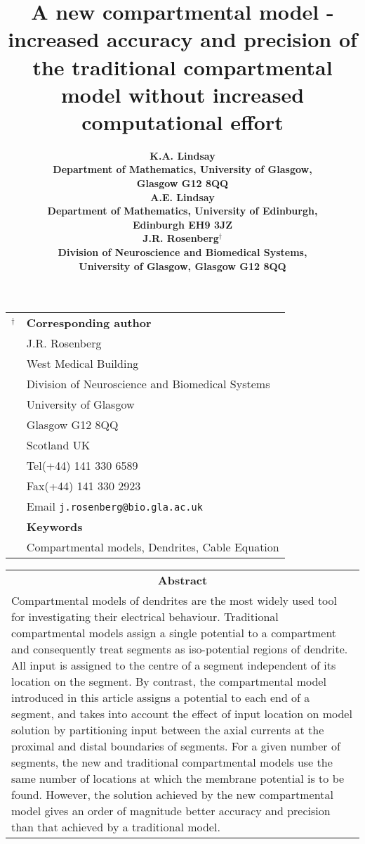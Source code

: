 \documentclass[11pt]{article}
\title{\LARGE\bf A new compartmental model - increased accuracy
and precision of the traditional compartmental model
without increased computational effort}
\author{\Large\bf K.A. Lindsay\\
Department of Mathematics, University of Glasgow,\\ Glasgow G12
8QQ \\[10pt]
\Large\bf A.E. Lindsay\\
Department of Mathematics, University of Edinburgh,\\ Edinburgh EH9
3JZ \\[10pt]
\Large\bf J.R. Rosenberg$^\dagger$\\
Division of Neuroscience and Biomedical Systems,\\
University of Glasgow, Glasgow G12 8QQ}
\begin{document}

\maketitle

\thispagestyle{empty}

\vfil

\begin{tabular}{ll}
$^\dagger$  & \textbf{Corresponding author} \\[5pt]
            & J.R. Rosenberg \\
            & West Medical Building \\
            & Division of Neuroscience and Biomedical Systems \\
            & University of Glasgow \\
            & Glasgow G12 8QQ \\
            & Scotland UK \\[5pt]
            & Tel\quad(+44) 141 330 6589 \\
            & Fax\quad(+44) 141 330 2923 \\
            & Email \verb$j.rosenberg@bio.gla.ac.uk$\\[10pt]
            & \textbf{Keywords} \\[5pt]
            & Compartmental models, Dendrites, Cable Equation
\end{tabular}

\vfil

\pagebreak[4]

\begin{center}
\begin{tabular}{p{5.2in}}
\multicolumn{1}{c}{\textbf{Abstract}}\\[10pt]

Compartmental models of dendrites are the most widely used tool
for investigating their electrical behaviour. Traditional
compartmental models assign a single potential to a compartment
and consequently treat segments as iso-potential regions of
dendrite. All input is assigned to the centre of a segment
independent of its location on the segment. By contrast, the
compartmental model introduced in this article assigns a potential
to each end of a segment, and takes into account the effect of
input location on model solution by partitioning input between the
axial currents at the proximal and distal boundaries of segments.
For a given number of segments, the new and traditional
compartmental models use the same number of locations at which the
membrane potential is to be found. However, the solution achieved
by the new compartmental model gives an order of magnitude better
accuracy and precision than that achieved by a traditional model.
\end{tabular}
\end{center}


\pagebreak[4]








\closegraphsfile
\end{document}
